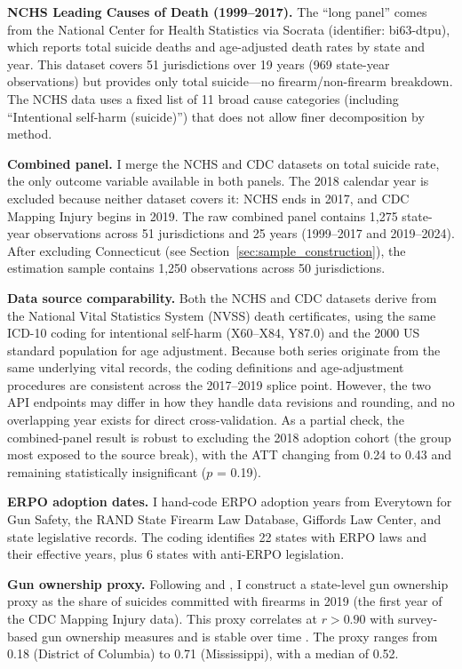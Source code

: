 \documentclass[12pt]{article}
\begin{document}
\textbf{NCHS Leading Causes of Death (1999--2017).} The ``long panel'' comes from the National Center for Health Statistics via Socrata (identifier: bi63-dtpu), which reports total suicide deaths and age-adjusted death rates by state and year. This dataset covers 51 jurisdictions over 19 years (969 state-year observations) but provides only total suicide---no firearm/non-firearm breakdown. The NCHS data uses a fixed list of 11 broad cause categories (including ``Intentional self-harm (suicide)'') that does not allow finer decomposition by method.

\textbf{Combined panel.} I merge the NCHS and CDC datasets on total suicide rate, the only outcome variable available in both panels. The 2018 calendar year is excluded because neither dataset covers it: NCHS ends in 2017, and CDC Mapping Injury begins in 2019. The raw combined panel contains 1,275 state-year observations across 51 jurisdictions and 25 years (1999--2017 and 2019--2024). After excluding Connecticut (see Section~\ref{sec:sample_construction}), the estimation sample contains 1,250 observations across 50 jurisdictions.

\textbf{Data source comparability.} Both the NCHS and CDC datasets derive from the National Vital Statistics System (NVSS) death certificates, using the same ICD-10 coding for intentional self-harm (X60--X84, Y87.0) and the 2000 US standard population for age adjustment. Because both series originate from the same underlying vital records, the coding definitions and age-adjustment procedures are consistent across the 2017--2019 splice point. However, the two API endpoints may differ in how they handle data revisions and rounding, and no overlapping year exists for direct cross-validation. As a partial check, the combined-panel result is robust to excluding the 2018 adoption cohort (the group most exposed to the source break), with the ATT changing from 0.24 to 0.43 and remaining statistically insignificant ($p$ = 0.19).

\textbf{ERPO adoption dates.} I hand-code ERPO adoption years from Everytown for Gun Safety, the RAND State Firearm Law Database, Giffords Law Center, and state legislative records. The coding identifies 22 states with ERPO laws and their effective years, plus 6 states with anti-ERPO legislation.

\textbf{Gun ownership proxy.} Following \citet{kleck2004measures} and \citet{azrael2004state}, I construct a state-level gun ownership proxy as the share of suicides committed with firearms in 2019 (the first year of the CDC Mapping Injury data). This proxy correlates at $r > 0.90$ with survey-based gun ownership measures and is stable over time \citep{cook2006life}. The proxy ranges from 0.18 (District of Columbia) to 0.71 (Mississippi), with a median of 0.52.
\end{document}
